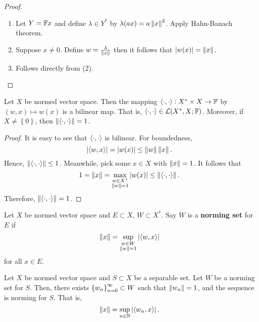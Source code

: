 \documentclass[a4paper]{article}
\begin{document}
\begin{proof}

\begin{enumerate}
\item Let $Y = \mathbb{F} x$ and define $\lambda \in Y^*$ by 
$\lambda(a x) = a \left\lVert x\right\rVert^2$. Apply Hahn-Banach theorem.

\item Suppose $x \neq 0$. Define $w = \frac{\lambda}{\left\lVert x\right\rVert}$
then it follows that $\left\lvert w(x)\right\rvert = \left\lVert x\right\rVert$.

\item Follows directly from (2).
\end{enumerate}

\end{proof}

\begin{prop}
Let $X$ be normed vector space. Then the mapping 
$\langle \cdot, \cdot \rangle : X^* \times X \to \mathbb{F}$ by 
$(w, x) \mapsto w(x)$ is a bilinear map. That is, 
$\langle \cdot , \cdot \rangle \in \mathcal{L}(X^*, X ; \mathbb{F})$. 
Moreover, 
if $X \neq \left\{ 0 \right\}$, 
then $\left\lVert \langle \cdot, \cdot \rangle\right\rVert
= 1$.
\end{prop}

\begin{proof}
It is easy to see that $\langle \cdot, \cdot \rangle$ is 
bilinear.  For boundedness, 
\[
\left\lvert \langle w, x \rangle\right\rvert = \left\lvert w(x)\right\rvert \leq \left\lVert w\right\rVert \left\lVert x\right\rVert.
\]
Hence, $\left\lVert \langle \cdot, \cdot \rangle\right\rVert \leq 1$. Meanwhile, 
pick some $x \in X$ with $\left\lVert x\right\rVert = 1$. It follows that 
\[
1 = \left\lVert x\right\rVert = \max_{\substack{w \in X^* \\ \left\lVert w\right\rVert = 1}}
\left\lvert w(x)\right\rvert \leq \left\lVert \langle \cdot, \cdot \rangle\right\rVert.
\]
Therefore, $\left\lVert \langle \cdot, \cdot \rangle\right\rVert = 1$.
\end{proof}

\begin{defi}
  Let $X$ be normed vector space and $E \subset X$, 
  $W \subset X^*$. Say $W$ is a \textbf{norming set}
  for $E$ if 
  \[
  \left\lVert x\right\rVert = \sup_{\substack{w \in W \\ \left\lVert w\right\rVert = 1}} 
  \left\lvert \langle w, x \rangle\right\rvert
  \]
  for all $x \in E$.
\end{defi}

\begin{prop}

Let $X$ be normed vector space and $S \subset X$ be a 
separable set. Let $W$ be a norming set for $S$. Then, 
there exists $\left\{ w_n \right\}_{n=0}^\infty \subset W$ such that $\left\lVert w_n\right\rVert 
= 1$, and the sequence is norming for $S$. That is, 
\[
\left\lVert x\right\rVert = \sup_{n \in \mathbb{N}} \left\lvert \langle w_n, x \rangle\right\rvert.
\]
\end{prop}
\end{document}
